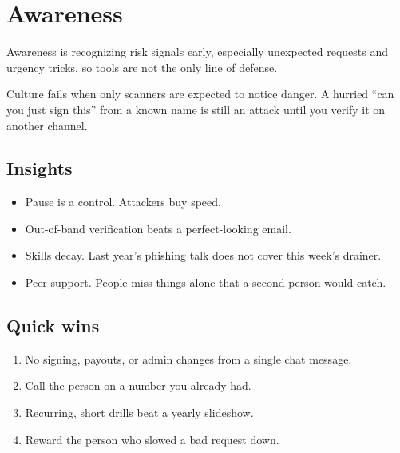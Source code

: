 \chapter{Awareness}

Awareness is recognizing risk signals early, especially
unexpected requests and urgency tricks, so tools are not
the only line of defense.

Culture fails when only scanners are expected to notice
danger. A hurried ``can you just sign this'' from a
known name is still an attack until you verify it on
another channel.

\section{Insights}

\begin{itemize}
  \item Pause is a control. Attackers buy speed.
  \item Out-of-band verification beats a perfect-looking
  email.
  \item Skills decay. Last year's phishing talk does not
  cover this week's drainer.
  \item Peer support. People miss things alone that a
  second person would catch.
\end{itemize}

\section{Quick wins}

\begin{enumerate}
  \item No signing, payouts, or admin changes from a
  single chat message.
  \item Call the person on a number you already had.
  \item Recurring, short drills beat a yearly slideshow.
  \item Reward the person who slowed a bad request down.
\end{enumerate}
